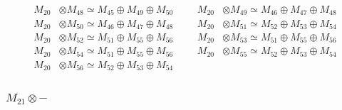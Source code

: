 \begin{align*}
M_{20} &\otimes M_{48} \simeq M_{45} \oplus M_{49} \oplus M_{50} &&& M_{20} &\otimes M_{49} \simeq M_{46} \oplus M_{47} \oplus M_{48}\\
M_{20} &\otimes M_{50} \simeq M_{46} \oplus M_{47} \oplus M_{48} &&& M_{20} &\otimes M_{51} \simeq M_{52} \oplus M_{53} \oplus M_{54}\\
M_{20} &\otimes M_{52} \simeq M_{51} \oplus M_{55} \oplus M_{56} &&& M_{20} &\otimes M_{53} \simeq M_{51} \oplus M_{55} \oplus M_{56}\\
M_{20} &\otimes M_{54} \simeq M_{51} \oplus M_{55} \oplus M_{56} &&& M_{20} &\otimes M_{55} \simeq M_{52} \oplus M_{53} \oplus M_{54}\\
M_{20} &\otimes M_{56} \simeq M_{52} \oplus M_{53} \oplus M_{54}
\end{align*}

\subsubsection{$ M_{21}\otimes -$}
